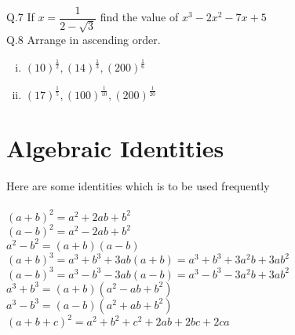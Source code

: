 Q.7 If $x = \dfrac{1}{2-\sqrt{3}}$ find the value of $x^3-2x^2-7x+5$\\
Q.8 Arrange in ascending order.
\begin{enumerate}[(i)]
\item $(10)^\frac{1}{2}, (14)^\frac{1}{3}, (200)^\frac{1}{6}$
\item $(17)^\frac{1}{5}, (100)^\frac{1}{10}, (200)^\frac{1}{20}$
\end{enumerate}
\section{Algebraic Identities}
Here are some identities which is to be used frequently\\\\
$(a+b)^2 = a^2+2ab+b^2$\\
$(a-b)^2 = a^2-2ab+b^2$\\
$a^2-b^2 = (a+b)(a-b)$\\
$(a+b)^3 = a^3+b^3+3ab(a+b) = a^3+b^3+3a^2b+3ab^2$\\
$(a-b)^3 = a^3-b^3-3ab(a-b) = a^3-b^3-3a^2b+3ab^2$\\
$a^3+b^3 = (a+b)(a^2-ab+b^2)$\\
$a^3-b^3 = (a-b)(a^2+ab+b^2)$\\
$(a+b+c)^2 = a^2+b^2+c^2+2ab+2bc+2ca$\\
